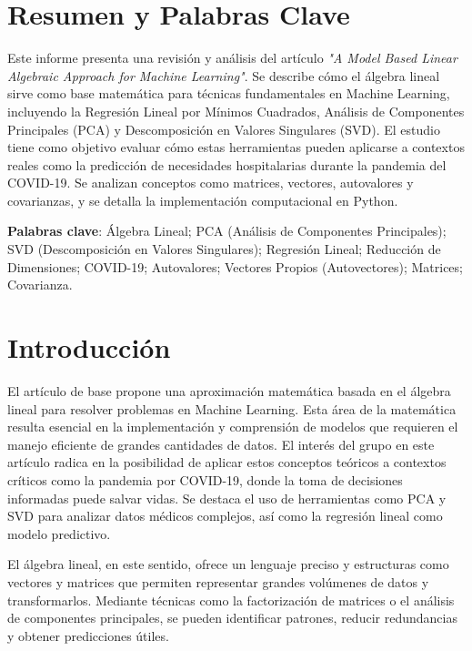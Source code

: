 \documentclass[12pt]{article}
\begin{document}
        \tableofcontents
        \newpage
        
        \onehalfspacing
        
        \section{Resumen y Palabras Clave}
        \noindent
        Este informe presenta una revisión y análisis del artículo \emph{"A Model Based Linear Algebraic Approach for Machine Learning"}. Se describe cómo el álgebra lineal sirve como base matemática para técnicas fundamentales en Machine Learning, incluyendo la Regresión Lineal por Mínimos Cuadrados, Análisis de Componentes Principales (PCA) y Descomposición en Valores Singulares (SVD). El estudio tiene como objetivo evaluar cómo estas herramientas pueden aplicarse a contextos reales como la predicción de necesidades hospitalarias durante la pandemia del COVID-19. Se analizan conceptos como matrices, vectores, autovalores y covarianzas, y se detalla la implementación computacional en Python.
        
        \vspace{1em}
        \noindent
        \textbf{Palabras clave}: Álgebra Lineal; PCA (Análisis de Componentes Principales); SVD (Descomposición en Valores Singulares); Regresión Lineal; Reducción de Dimensiones; COVID-19; Autovalores; Vectores Propios (Autovectores); Matrices; Covarianza.
        \newpage
        \section{Introducción}
        \noindent
        El artículo de base propone una aproximación matemática basada en el álgebra lineal para resolver problemas en Machine Learning. Esta área de la matemática resulta esencial en la implementación y comprensión de modelos que requieren el manejo eficiente de grandes cantidades de datos. El interés del grupo en este artículo radica en la posibilidad de aplicar estos conceptos teóricos a contextos críticos como la pandemia por COVID-19, donde la toma de decisiones informadas puede salvar vidas. Se destaca el uso de herramientas como PCA y SVD para analizar datos médicos complejos, así como la regresión lineal como modelo predictivo.
        
        \vspace{1em}
        \noindent
        El álgebra lineal, en este sentido, ofrece un lenguaje preciso y estructuras como vectores y matrices que permiten representar grandes volúmenes de datos y transformarlos. Mediante técnicas como la factorización de matrices o el análisis de componentes principales, se pueden identificar patrones, reducir redundancias y obtener predicciones útiles.
        
\end{document}
